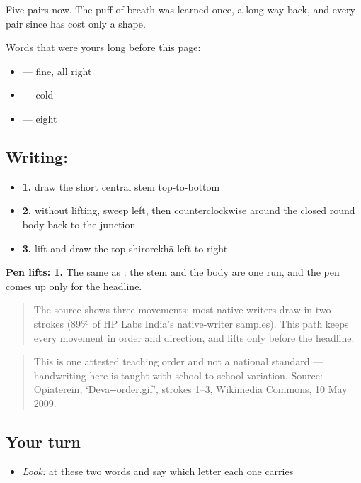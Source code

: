 Five pairs now. The puff of breath was learned once, a long way back, and every pair since has cost only a shape.

Words that were yours long before this page:

\begin{itemize}
\raggedright
  \item \textbf{} — fine, all right
  \item \textbf{} — cold
  \item \textbf{} — eight
\end{itemize}

\subsection*{Writing: }

\begin{itemize}
\raggedright
  \item \textbf{1.} draw the short central stem top-to-bottom
  \item \textbf{2.} without lifting, sweep left, then counterclockwise around the closed round body back to the junction
  \item \textbf{3.} lift and draw the top shirorekhā left-to-right
\end{itemize}

\textbf{Pen lifts: 1.} The same as \textbf{}: the stem and the body are one run, and the pen comes up only for the headline.

\begin{quote}
The source shows three movements; most native writers draw  in two strokes (89\% of HP Labs India's native-writer samples). This path keeps every movement in order and direction, and lifts only before the headline.
\end{quote}

\begin{quote}
This is one attested teaching order and not a national standard — handwriting here is taught with school-to-school variation. Source: Opiaterein, ‘Deva--order.gif’, strokes 1–3, Wikimedia Commons, 10 May 2009.
\end{quote}

\subsection*{Your turn}
\begin{itemize}
\raggedright
  \item \emph{Look:} at these two words and say which letter each one carries
\end{itemize}


